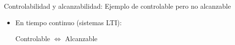 \documentclass{beamer}
\begin{document}
\begin{frame}{Controlabilidad y alcanzabilidad: Ejemplo de controlable pero no alcanzable}
\begin{itemize}
        \begin{itemize}
            \item Alcanzabilidad
            $$\mathbf{W}_r = \begin{bmatrix}
                \begin{bmatrix}
                    1 \\
                    0
                \end{bmatrix}
                &
                \begin{bmatrix}
                    1 & 0\\
                    0 & 0
                \end{bmatrix}
                \begin{bmatrix}
                    1 \\
                    0
                \end{bmatrix}
            \end{bmatrix}
            =
            \begin{bmatrix}
                1 & 1\\
                0 & 0
            \end{bmatrix}
            \Rightarrow
            \mathrm{rank}(\mathbf{W}_r)=1<2=n
            \Rightarrow
            (\mathbf{A_d}, \mathbf{B_u})~\mathrm{no~alcanzable}
            $$ 
            \item Controlabilidad
            $$u[k] = -x_1[k]
            \Rightarrow
            \begin{aligned}
                & x_1[k+1] = x_1[k] - x_1[k] = 0 \\
                & x_2[k+1] = 0
            \end{aligned}\Rightarrow
            \begin{aligned}
                \forall \mathbf{x}_0 = \mathbf{x}[0] \\
                \mathbf{x}[1] = \begin{bmatrix}
                    0 \\
                    0
                \end{bmatrix}
            \end{aligned}
            \Rightarrow
            (\mathbf{A_d}, \mathbf{B_u})~\mathrm{controlable}
            $$
        \end{itemize}
    \item En tiempo continuo (sistemas LTI):
    
        Controlable $\iff$ Alcanzable
    \end{itemize}
\end{frame}
\end{document}
